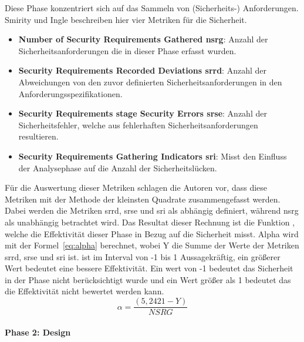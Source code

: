 \documentclass[12pt, a4paper, ngerman]{article}
\begin{document}
Diese Phase konzentriert sich auf das Sammeln von (Sicherheits-) Anforderungen.
Smirity und Ingle beschreiben hier vier Metriken für die Sicherheit.
\begin{itemize}
  \item \textbf{Number of Security Requirements Gathered \ac{nsrg}}: Anzahl der Sicherheitsanforderungen die in dieser Phase erfasst wurden.
  \item \textbf{Security Requirements Recorded Deviations \ac{srrd}}: Anzahl der Abweichungen von den zuvor definierten Sicherheitsanforderungen in den Anforderungsspezifikationen.
  \item \textbf{Security Requirements stage Security Errors \ac{srse}}: Anzahl der Sicherheitsfehler, welche aus fehlerhaften Sicherheitsanforderungen resultieren.
  \item \textbf{Security Requirements Gathering Indicators \ac{sri}}: Misst den Einfluss der Analysephase auf die Anzahl der Sicherheitslücken. 
\end{itemize}
Für die Auswertung dieser Metriken schlagen die Autoren vor, dass diese Metriken mit der Methode der kleinsten Quadrate zusammengefasst werden.
Dabei werden die Metriken \ac{srrd}, \ac{srse} und \ac{sri} als abhängig definiert, während \ac{nsrg} als unabhängig betrachtet wird.
Das Resultat dieser Rechnung ist die Funktion \alpha, welche die Effektivität dieser Phase in Bezug auf die Sicherheit misst.
Alpha wird mit der Formel~\ref{eq:alpha} berechnet, wobei Y die Summe der Werte der Metriken \ac{srrd}, \ac{srse} und \ac{sri} ist.
\alpha ist im Interval von -1 bis 1 Aussagekräftig, ein größerer Wert bedeutet eine bessere Effektivität.
Ein wert von -1 bedeutet das Sicherheit in der Phase nicht berücksichtigt wurde 
und ein Wert größer als 1 bedeutet das die Effektivität nicht bewertet werden kann.
\begin{equation} \label{eq:alpha}
  \alpha = \frac{ \left( 5,2421 - Y \right) }{ NSRG }
\end{equation}

\paragraph{Phase 2: Design}
\end{document}
